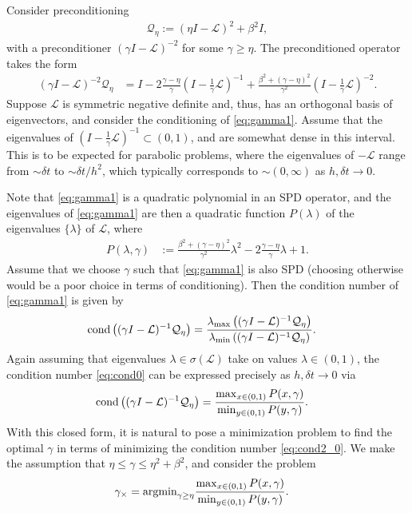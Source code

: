 \documentclass[a4paper,10pt]{article}
\begin{document}
Consider preconditioning
%
\begin{align*}
\mathcal{Q}_\eta := (\eta I - \mathcal{L})^2 + \beta^2 I,
\end{align*}
%
with a preconditioner $(\gamma I - \mathcal{L})^{-2}$ for some $\gamma \geq \eta$. 
The preconditioned operator takes the form
%
\begin{align}\label{eq:gamma1}
(\gamma I- {\mathcal{L}})^{-2}\mathcal{Q}_\eta & =
	I - 2\frac{\gamma - \eta}{\gamma} ( I- \tfrac{1}{\gamma}{\mathcal{L}})^{-1} + 
	\frac{\beta^2 + (\gamma - \eta)^2}{\gamma^2}( I- \tfrac{1}{\gamma}{\mathcal{L}})^{-2}.
\end{align}
%
Suppose ${\mathcal{L}}$ is symmetric negative definite and, thus, has an orthogonal
basis of eigenvectors, and consider the conditioning of \eqref{eq:gamma1}. Assume that the
eigenvalues of $( I- \tfrac{1}{\gamma}{\mathcal{L}})^{-1} \subset (0,1)$, and are
somewhat dense in this interval. This is to be expected for parabolic problems, where the
eigenvalues of $-{\mathcal{L}}$ range from $\sim \delta t$ to $\sim \delta t/h^2$,
which typically corresponds to $\sim(0,\infty)$ as $h,\delta t\to 0$.

Note that \eqref{eq:gamma1} is a quadratic polynomial in an SPD operator, and the
eigenvalues of \eqref{eq:gamma1} are then a quadratic function $P(\lambda)$ of the
eigenvalues $\{\lambda\}$ of ${\mathcal{L}}$, where
%
\begin{align}\label{eq:quadratic2}
P(\lambda,\gamma) &:= \frac{\beta^2 + (\gamma-\eta)^2}{\gamma^2}\lambda^2 -
	2\frac{\gamma - \eta}{\gamma}\lambda + 1.
\end{align}
%
Assume that we choose $\gamma$ such that \eqref{eq:gamma1} is also SPD (choosing otherwise
would be a poor choice in terms of conditioning). Then the condition number of
\eqref{eq:gamma1} is given by
%
\begin{align}\label{eq:cond2_0}
\textnormal{cond}\left((\gamma I- {\mathcal{L}})^{-1}\mathcal{Q}_\eta\right) & =
	\frac{\lambda_{\max}\left((\gamma I- {\mathcal{L}})^{-1}\mathcal{Q}_\eta\right)}
		{\lambda_{\min}\left((\gamma I- {\mathcal{L}})^{-1}\mathcal{Q}_\eta\right)}.
\end{align}
%
Again assuming that eigenvalues $\lambda\in\sigma\left({\mathcal{L}}\right)$ take
on values $\lambda\in(0,1)$, the condition number \eqref{eq:cond0} can be expressed
precisely as $h,\delta t\to 0$ via
%
\begin{align}\label{eq:cond2_1}
\textnormal{cond}\left((\gamma I- {\mathcal{L}})^{-1}\mathcal{Q}_\eta\right) & =
	\frac{\max_{x\in(0,1)} P(x,\gamma)}{\min_{y\in(0,1)} P(y,\gamma)}.
\end{align}
%
With this closed form, it is natural to pose a minimization problem to find the
optimal $\gamma$ in terms of minimizing the condition number \eqref{eq:cond2_0}.
We make the assumption that $\eta \leq \gamma \leq \eta^2+\beta^2$, and consider
the problem
%
\begin{align*}
\gamma_\times & = \textnormal{argmin}_{\gamma \geq \eta}
	\frac{\max_{x\in(0,1)} P(x,\gamma)}{\min_{y\in(0,1)} P(y,\gamma)}.
\end{align*}
%
\end{document}
